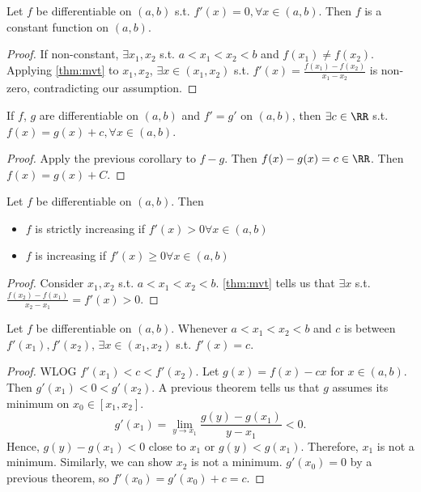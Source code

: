 \documentclass[11pt]{scrartcl}
\numberwithin{equation}{section}
\begin{document}
\begin{corollary}
    Let $f$ be differentiable on $(a,b)$ s.t. $f'(x) = 0, \forall x \in(a,b)$. Then $f$ is a constant function on $(a,b)$. 
\end{corollary}
\begin{proof}
    If non-constant, $\exists x_1,x_2$ s.t. $a<x_1<x_2<b$ and 
    $f(x_1)\neq f(x_2)$. Applying \cref{thm:mvt} to $x_1,x_2$,
    $\exists x\in (x_1,x_2)$ s.t. $f'(x) = \frac{f(x_1)-f(x_2)}{x_1-x_2}$ 
    is non-zero, contradicting our assumption.
\end{proof}
\begin{corollary}
    If $f$, $g$ are differentiable on $(a,b)$ and $f'=g'$ on 
    $(a,b)$, then $\exists c\in\RR$ s.t. $f(x)=g(x) + c, \forall x\in(a,b)$.
\end{corollary}
\begin{proof}
    Apply the previous corollary to $f-g$. Then $f(x)-g(x) = c\in\RR$.
    Then $f(x) = g(x)+C$.
\end{proof}

\begin{corollary}
    Let $f$ be differentiable on $(a,b)$. Then 
    \begin{itemize}
        \item $f$ is strictly increasing if $f'(x)>0 \forall x \in (a,b)$
        \item $f$ is increasing if $f'(x)\geq 0 \forall x \in (a,b)$
    \end{itemize}    
\end{corollary}

\begin{proof}
    Consider $x_1,x_2$ s.t. $a<x_1<x_2<b$. \cref{thm:mvt} tells us 
    that $\exists x$ s.t. $\frac{f(x_2)-f(x_1)}{x_2-x_1} = f'(x) > 0$.
\end{proof}

\begin{theorem}
    \label{thm:ivtderivatives}
    Let $f$ be differentiable on $(a,b)$. Whenever $a<x_1<x_2<b$ and 
    $c$ is between $f'(x_1), f'(x_2)$, $\exists x\in(x_1,x_2)$ s.t.
    $f'(x)=c$.
\end{theorem}

\begin{proof}
    WLOG $f'(x_1)<c<f'(x_2)$. Let $g(x) = f(x)-cx$ for $x\in (a,b)$.
    Then $g'(x_1)<0<g'(x_2)$. A previous theorem tells us that $g$ 
    assumes its minimum on $x_0\in[x_1,x_2]$.
    \[
        g'(x_1) = \lim_{y\rightarrow x_1}\frac{g(y)-g(x_1)}{y-x_1}<0.
    \]
    Hence, $g(y)-g(x_1)<0$ close to $x_1$ or $g(y)<g(x_1)$.
    Therefore, $x_1$ is not a minimum. Similarly, we can show $x_2$ is 
    not a minimum. $g'(x_0)=0$ by a previous theorem, 
    so $f'(x_0) = g'(x_0) + c = c$.
\end{proof}
\clearpage
\end{document}
